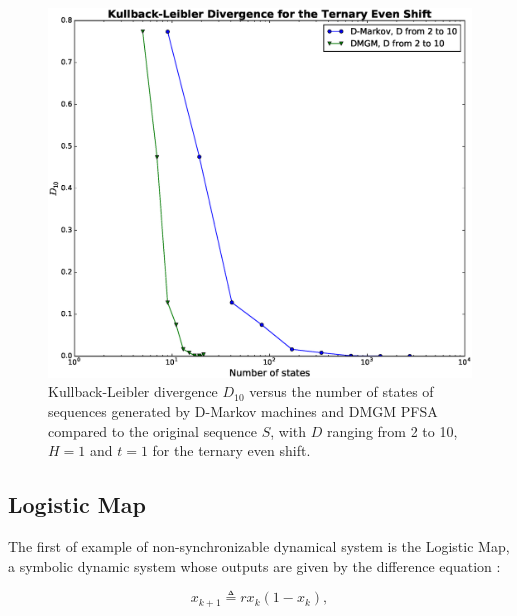 {\begin{figure}[h]
\centering
\includegraphics[scale=0.35]{Figuras/ternaryeven_kld_mk4.eps}
\caption{Kullback-Leibler divergence $D_{10}$ versus the number of states of sequences generated by D-Markov machines and DMGM PFSA compared to the original sequence $S$, with $D$ ranging from 2 to 10, $H=1$ and $t=1$ for the ternary even shift.\label{fig:ternevenklddmgm}}
\end{figure}


\FloatBarrier

\subsection{Logistic Map}


The first of example of non-synchronizable dynamical system is the Logistic Map, a symbolic dynamic system whose outputs are given by the difference equation \cite{strogatz2001nonlinear}:

\begin{equation}
x_{k+1} \triangleq rx_k(1-x_k), \label{eq:logisticmap}
\end{equation}


}
